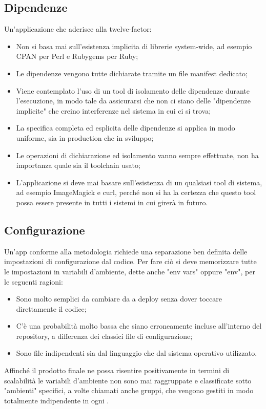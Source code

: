 \documentclass[PianoDiQualifica.tex]{subfiles}
\begin{document}
\subsection{Dipendenze}
Un'applicazione che aderisce alla twelve-factor:
\begin{itemize}
\item Non si basa mai sull'esistenza implicita di librerie system-wide, ad esempio CPAN per Perl e Rubygems per Ruby;
\item Le dipendenze vengono tutte dichiarate tramite un file manifest dedicato;
\item Viene contemplato l'uso di un tool di isolamento delle dipendenze durante l'esecuzione, in modo tale da assicurarsi che non ci siano delle "dipendenze implicite" che creino interferenze nel sistema in cui ci si trova;
\item La specifica completa ed esplicita delle dipendenze si applica in modo uniforme, sia in production che in sviluppo;
\item Le operazioni di dichiarazione ed isolamento vanno sempre effettuate, non ha importanza quale sia il toolchain usato;
\item L'applicazione si deve mai basare sull'esistenza di un qualsiasi tool di sistema, ad esempio ImageMagick e curl, perché non si ha la certezza che questo tool possa essere presente in tutti i sistemi in cui girerà in futuro.
\end{itemize}

\subsection{Configurazione}
Un'app conforme alla metodologia richiede una separazione ben definita delle impostazioni di configurazione dal codice.
Per fare ciò si deve memorizzare tutte le impostazioni in variabili d'ambiente, dette anche "env vars" oppure "env", per le seguenti ragioni:
\begin{itemize}
\item Sono molto semplici da cambiare da  a deploy senza dover toccare direttamente il codice;
\item C'è una probabilità molto bassa che siano erroneamente incluse all'interno del repository, a differenza dei classici file di configurazione;
\item Sono file indipendenti sia dal linguaggio che dal sistema operativo utilizzato.
\end{itemize}
Affinché il prodotto finale ne possa risentire positivamente in termini di scalabilità le variabili d'ambiente non sono mai raggruppate e classificate sotto "ambienti" specifici, a volte chiamati anche gruppi, che vengono gestiti in modo totalmente indipendente in ogni .
\end{document}
